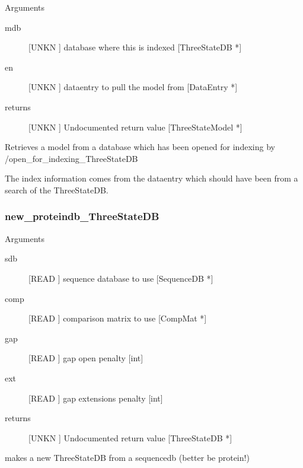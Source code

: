 Arguments
\begin{description}
\item[mdb] [UNKN ] database where this is indexed [ThreeStateDB *]
\item[en] [UNKN ] dataentry to pull the model from [DataEntry *]
\item[returns] [UNKN ] Undocumented return value [ThreeStateModel *]
\end{description}
Retrieves a model from a database which has been opened
for indexing by /open_for_indexing_ThreeStateDB


The index information comes from the dataentry which should 
have been from a search of the ThreeStateDB.


\subsubsection{new_proteindb_ThreeStateDB}

Arguments
\begin{description}
\item[sdb] [READ ] sequence database to use [SequenceDB *]
\item[comp] [READ ] comparison matrix to use [CompMat *]
\item[gap] [READ ] gap open penalty [int]
\item[ext] [READ ] gap extensions penalty [int]
\item[returns] [UNKN ] Undocumented return value [ThreeStateDB *]
\end{description}
makes a new ThreeStateDB from a
sequencedb (better be protein!)




